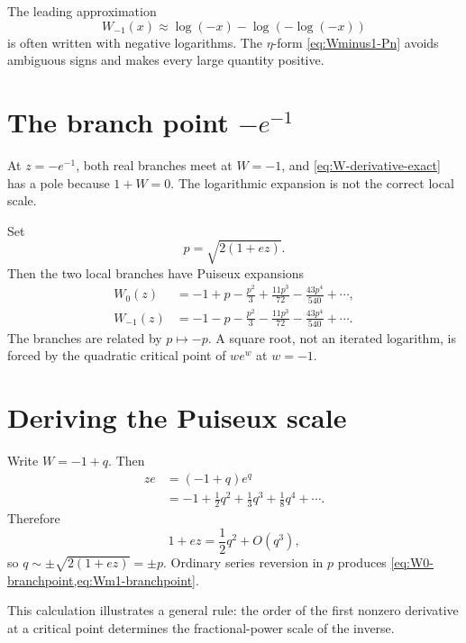 \documentclass[11pt,openany]{book}
\theoremstyle{definition}
\theoremstyle{plain}
\theoremstyle{remark}
\begin{document}
The leading approximation
\[
 W_{-1}(x)\approx \log(-x)-\log(-\log(-x))
\]
is often written with negative logarithms. The \(\eta\)-form \cref{eq:Wminus1-Pn} avoids ambiguous signs and makes every large quantity positive.

\section{The branch point \texorpdfstring{\(-e^{-1}\)}{-1/e}}
At \(z=-e^{-1}\), both real branches meet at \(W=-1\), and \cref{eq:W-derivative-exact} has a pole because \(1+W=0\). The logarithmic expansion is not the correct local scale.

Set
\begin{equation}\label{eq:p-branchpoint}
 p=\sqrt{2(1+ez)}.
\end{equation}
Then the two local branches have Puiseux expansions
\begin{align}
 W_0(z)&=-1+p-\frac{p^2}{3}
 +\frac{11p^3}{72}-\frac{43p^4}{540}+\cdots,
 \label{eq:W0-branchpoint}\\
 W_{-1}(z)&=-1-p-\frac{p^2}{3}
 -\frac{11p^3}{72}-\frac{43p^4}{540}+\cdots.
 \label{eq:Wm1-branchpoint}
\end{align}
The branches are related by \(p\mapsto-p\). A square root, not an iterated logarithm, is forced by the quadratic critical point of \(we^w\) at \(w=-1\).

\section{Deriving the Puiseux scale}
Write \(W=-1+q\). Then
\begin{align*}
 ze&=(-1+q)e^q\\
 &=-1+\frac12q^2+\frac13q^3+\frac18q^4+\cdots.
\end{align*}
Therefore
\[
 1+ez=\frac12q^2+O(q^3),
\]
so \(q\sim\pm\sqrt{2(1+ez)}=\pm p\). Ordinary series reversion in \(p\) produces \cref{eq:W0-branchpoint,eq:Wm1-branchpoint}.

This calculation illustrates a general rule: the order of the first nonzero derivative at a critical point determines the fractional-power scale of the inverse.
\end{document}
